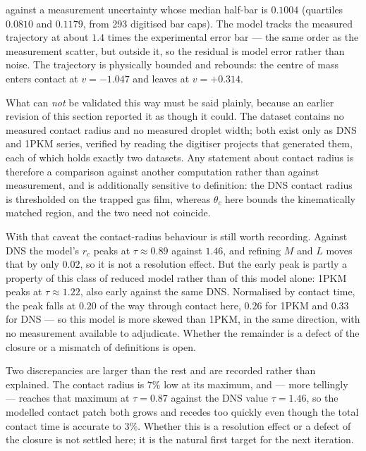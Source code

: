 against a measurement uncertainty whose median half-bar is $0.1004$ (quartiles $0.0810$
and $0.1179$, from 293 digitised bar caps). The model tracks the measured trajectory at
about $1.4$ times the experimental error bar --- the same order as the measurement
scatter, but outside it, so the residual is model error rather than noise. The trajectory
is physically bounded and rebounds: the centre of mass enters contact at $v=-1.047$ and
leaves at $v=+0.314$.

What can \emph{not} be validated this way must be said plainly, because an earlier
revision of this section reported it as though it could. The dataset contains no measured
contact radius and no measured droplet width; both exist only as DNS and 1PKM series,
verified by reading the digitiser projects that generated them, each of which holds
exactly two datasets. Any statement about contact radius is therefore a comparison against
another computation rather than against measurement, and is additionally sensitive to
definition: the DNS contact radius is thresholded on the trapped gas film, whereas
$\theta_c$ here bounds the kinematically matched region, and the two need not coincide.

With that caveat the contact-radius behaviour is still worth recording. Against DNS the
model's $r_c$ peaks at $\tau\approx0.89$ against $1.46$, and refining $M$ and $L$ moves
that by only $0.02$, so it is not a resolution effect. But the early peak is partly a
property of this class of reduced model rather than of this model alone: 1PKM peaks at
$\tau\approx1.22$, also early against the same DNS. Normalised by contact time, the peak
falls at $0.20$ of the way through contact here, $0.26$ for 1PKM and $0.33$ for DNS --- so
this model is more skewed than 1PKM, in the same direction, with no measurement available
to adjudicate. Whether the remainder is a defect of the closure or a mismatch of
definitions is open.

Two discrepancies are larger than the rest and are recorded rather than explained. The
contact radius is $7\%$ low at its maximum, and --- more tellingly --- reaches that maximum
at $\tau=0.87$ against the DNS value $\tau=1.46$, so the modelled contact patch both grows
and recedes too quickly even though the total contact time is accurate to $3\%$. Whether
this is a resolution effect or a defect of the closure is not settled here; it is the
natural first target for the next iteration.

